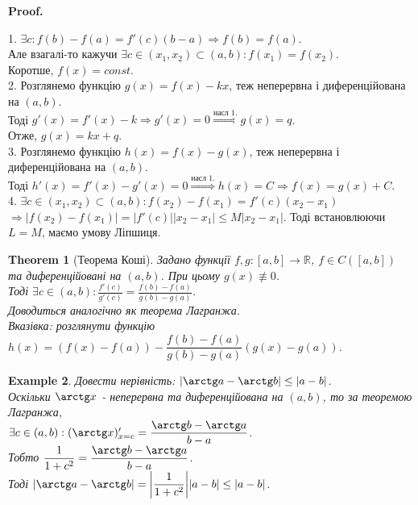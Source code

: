 \documentclass[a4paper, 14pt]{article}
\makeatletter
\def\huge{\displaystyle}
\def\qed{$\blacksquare$}
\theoremstyle{theoremdd}
\newtheorem{theorem}{Theorem}[subsection]
\theoremstyle{theoremdd}
\theoremstyle{theoremdd}
\theoremstyle{theoremdd}
\newtheorem{example}[theorem]{Example}
\theoremstyle{theoremdd}
\theoremstyle{theoremdd}
\theoremstyle{theoremdd}
\theoremstyle{theoremdd}
\renewenvironment{proof}[1][Proof.\\]{\par
\pushQED{\hfill \qed}%
\normalfont \topsep6\p@\@plus6\p@\relax
\trivlist
\item\relax
{\bfseries
#1\@addpunct{.}}\hspace\labelsep\ignorespaces
}{%
\popQED\endtrivlist\@endpefalse
}
\makeatother
\begin{document}
\begin{proof}
1. $\exists c: f(b)-f(a) = f'(c)(b-a) \Rightarrow f(b) = f(a)$.\\
Але взагалі-то кажучи $\exists c \in (x_1,x_2) \subset (a,b): f(x_1) = f(x_2)$.\\
Коротше, $f(x) = const$.
\bigskip \\

2. Розглянемо функцію $g(x) = f(x) - kx$, теж неперервна і диференційована на $(a,b)$.\\
Тоді $g'(x) = f'(x) - k \Rightarrow g'(x) = 0 \overset{\textrm{насл 1.}}{\Rightarrow} g(x) = q$.\\
Отже, $g(x) = kx + q$.
\bigskip \\

3. Розглянемо функцію $h(x) = f(x) - g(x)$, теж неперервна і диференційована на $(a,b)$.\\
Тоді $h'(x) = f'(x) - g'(x) = 0 \overset{\textrm{насл 1.}}{\Rightarrow} h(x) = C \Rightarrow f(x) = g(x) + C$.
\bigskip \\

4. $\exists c \in (x_1,x_2) \subset (a,b): f(x_2)-f(x_1)=f'(c)(x_2-x_1)$\\
$\Rightarrow |f(x_2)-f(x_1)|=|f'(c)||x_2-x_1| \leq M|x_2-x_1|$. Тоді встановлюючи $L=M$, маємо умову Ліпшиця.
\end{proof}

\begin{theorem}[Теорема Коші]
Задано функції $f,g: [a,b] \to \mathbb{R}$, $f \in C([a,b])$ та диференційовані на $(a,b)$. При цьому $g(x) \not\equiv 0$.\\
Тоді $\exists c \in (a,b): \huge \frac{f'(c)}{g'(c)}  =  \frac{f(b)-f(a)}{g(b)-g(a)}$.\\
\textit{Доводиться аналогічно як теорема Лагранжа.}\\
\textit{Вказівка: розглянути функцію $h(x) = (f(x) - f(a)) - \dfrac{f(b)-f(a)}{g(b)-g(a)}(g(x)-g(a))$.}
\end{theorem}

\begin{example}
Довести нерівність: $|\arctg a - \arctg b| \leq |a-b|$.\\
Оскільки $\arctg x$ - неперервна та диференційована на $(a,b)$, то за теоремою Лагранжа,\\
$\exists c \in (a,b): (\arctg x)'_{x = c} = \dfrac{\arctg b - \arctg a}{b-a}$.\\
Тобто $\dfrac{1}{1+c^2} =\dfrac{\arctg b - \arctg a}{b-a}$.\\
Тоді $|\arctg a - \arctg b| = \abs{\dfrac{1}{1+c^2}} |a-b| \leq |a-b|$.
\end{example}
\end{document}
